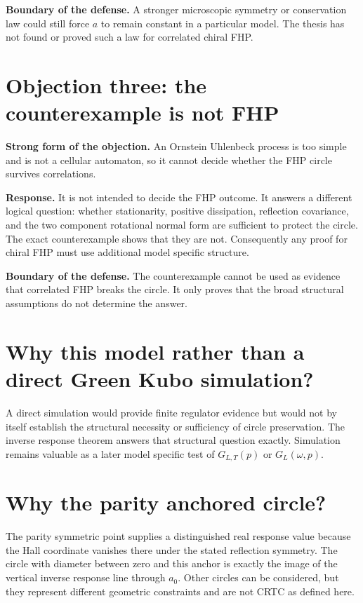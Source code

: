 \textbf{Boundary of the defense.} A stronger microscopic symmetry or conservation law could still force $a$ to remain constant in a particular model. The thesis has not found or proved such a law for correlated chiral FHP.

\section{Objection three: the counterexample is not FHP}
\textbf{Strong form of the objection.} An Ornstein Uhlenbeck process is too simple and is not a cellular automaton, so it cannot decide whether the FHP circle survives correlations.

\textbf{Response.} It is not intended to decide the FHP outcome. It answers a different logical question: whether stationarity, positive dissipation, reflection covariance, and the two component rotational normal form are sufficient to protect the circle. The exact counterexample shows that they are not. Consequently any proof for chiral FHP must use additional model specific structure.

\textbf{Boundary of the defense.} The counterexample cannot be used as evidence that correlated FHP breaks the circle. It only proves that the broad structural assumptions do not determine the answer.

\section{Why this model rather than a direct Green Kubo simulation?}
A direct simulation would provide finite regulator evidence but would not by itself establish the structural necessity or sufficiency of circle preservation. The inverse response theorem answers that structural question exactly. Simulation remains valuable as a later model specific test of $G_{L,T}(p)$ or $G_L(\omega,p)$.

\section{Why the parity anchored circle?}
The parity symmetric point supplies a distinguished real response value because the Hall coordinate vanishes there under the stated reflection symmetry. The circle with diameter between zero and this anchor is exactly the image of the vertical inverse response line through $a_0$. Other circles can be considered, but they represent different geometric constraints and are not CRTC as defined here.

